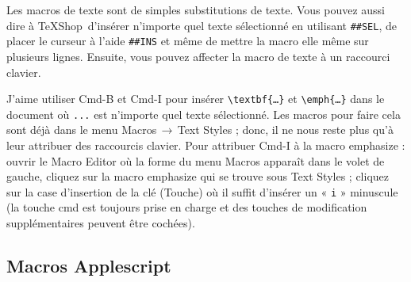 \documentclass[11pt,french]{article}
\newcommand{\TS}{\textsf{\TeX Shop}}
\newcommand{\cmd}[1]{\textsf{#1}}
\newcommand{\mnu}[1]{\textsf{#1}}
\newcommand{\To}{\,\(\to\)\,}
\begin{document}
Les macros de texte sont de simples substitutions de texte. Vous pouvez aussi dire à \TS\ d'insérer n'importe quel texte sélectionné en utilisant \verb|##SEL|, de placer le curseur à l'aide \verb|##INS| et même de mettre la macro elle même sur plusieurs lignes. Ensuite, vous pouvez affecter la macro de texte à un raccourci clavier.

J'aime utiliser \cmd{Cmd-B} et \cmd{Cmd-I} pour insérer \verb|\textbf{…}| et \verb|\emph{…}| dans le document où \texttt {...} est n'importe quel texte sélectionné. Les macros pour faire cela sont déjà dans le menu \mnu{Macros}\To\mnu{Text Styles} ; donc, il ne nous reste plus qu'à leur attribuer des raccourcis clavier. Pour attribuer \cmd{Cmd-I} à la macro \mnu{emphasize} : ouvrir le \mnu{Macro Editor} où la forme du menu \mnu{Macros} apparaît dans le volet de gauche, cliquez sur la macro \mnu{emphasize} qui se trouve sous \mnu{Text Styles} ; cliquez sur la case d'insertion de la clé (\mnu{Touche}) où il suffit d'insérer un « \texttt{i} » minuscule (la touche \cmd{cmd} est toujours prise en charge et des touches de modification supplémentaires peuvent être cochées).

%

\subsection{Macros Applescript}
\end{document}
